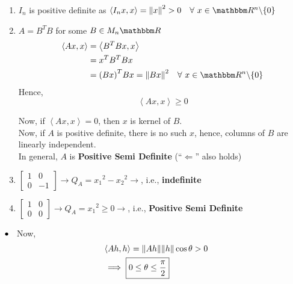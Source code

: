 \documentclass[Analysis-3]{subfiles}
\begin{document}
\begin{Eg}{}{}
    \begin{enumerate}
        \item  $I_n$ is positive definite as $\left\langle I_nx, x \right\rangle = {\|x \|}^2 > 0 \quad \forall\ x \in \R^n \backslash \{0\}$
        \item $A = B^TB$ for some $B \in M_n{\R}$
              \begin{align*}
                  \left\langle Ax,x \right\rangle & = \left\langle B^TBx,x \right\rangle                                    \\
                                                  & = x^TB^TBx                                                              \\
                                                  & = {(Bx)}^T Bx = {\| Bx \|}^2 \quad \forall\ x \in \R^n \backslash \{0\}
              \end{align*}
              Hence, \[ \left\langle Ax,x \right\rangle \geq 0 \]

              Now, if $ \left\langle Ax,x \right\rangle = 0 $, then  $x$ is kernel of $B$. \\
              Now, if $A$ is positive definite, there is no such $x$, hence, columns of $B$ are linearly independent. \\
              In general, $A$ is \textbf{Positive Semi Definite} (``$\Longleftarrow$'' also holds)

        \item $\begin{bmatrix}
                      1 & 0  \\
                      0 & -1
                  \end{bmatrix} \longrightarrow Q_A = {x_1}^2 - {x_2}^2 \longrightarrow $, i.e., \textbf{indefinite}
        \item  $\begin{bmatrix}
                      1 & 0 \\
                      0 & 0
                  \end{bmatrix} \longrightarrow Q_A = {x_1}^2 \geq 0 \longrightarrow $, i.e., \textbf{Positive Semi Definite}

    \end{enumerate}
\end{Eg}

$\bullet \hspace{2mm}$ Now,
\begin{align*}
     & \left\langle Ah, h \right\rangle = \norm{Ah}\norm{h}\cos{\theta} > 0 \\
     & \implies \boxed{0 \leq \theta \leq \frac{\pi}{2}}
\end{align*}
\end{document}
